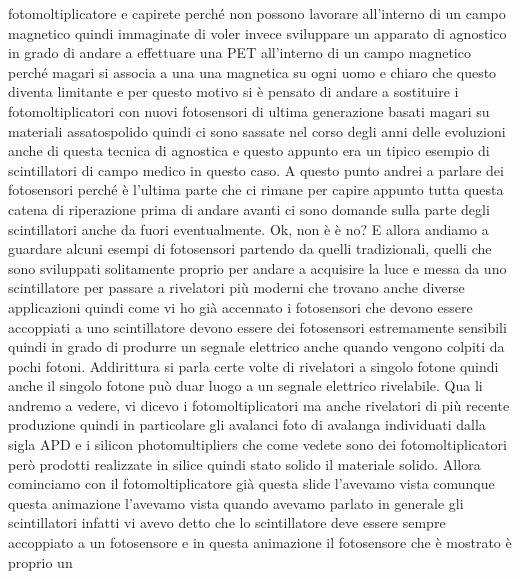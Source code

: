 {fotomoltiplicatore e capirete perché non possono lavorare all'interno di un campo magnetico quindi immaginate di voler invece sviluppare un apparato di agnostico in grado di andare a effettuare una PET all'interno di un campo magnetico perché magari si associa a una una magnetica su ogni uomo e chiaro che questo diventa limitante e per questo motivo si è pensato di andare a sostituire i fotomoltiplicatori con nuovi fotosensori di ultima generazione basati magari su materiali assatospolido quindi ci sono sassate nel corso degli anni delle evoluzioni anche di questa tecnica di agnostica e questo appunto era un tipico esempio di scintillatori di campo medico in questo caso. A questo punto andrei a parlare dei fotosensori perché è l'ultima parte che ci rimane per capire appunto tutta questa catena di riperazione prima di andare avanti ci sono domande sulla parte degli scintillatori anche da fuori eventualmente. Ok, non è è no? E allora andiamo a guardare alcuni esempi di fotosensori partendo da quelli tradizionali, quelli che sono sviluppati solitamente proprio per andare a acquisire la luce e messa da uno scintillatore per passare a rivelatori più moderni che trovano anche diverse applicazioni quindi come vi ho già accennato i fotosensori che devono essere accoppiati a uno scintillatore devono essere dei fotosensori estremamente sensibili quindi in grado di produrre un segnale elettrico anche quando vengono colpiti da pochi fotoni. Addirittura si parla certe volte di rivelatori a singolo fotone quindi anche il singolo fotone può duar luogo a un segnale elettrico rivelabile. Qua li andremo a vedere, vi dicevo i fotomoltiplicatori ma anche rivelatori di più recente produzione quindi in particolare gli avalanci foto di avalanga individuati dalla sigla APD e i silicon photomultipliers che come vedete sono dei fotomoltiplicatori però prodotti realizzate in silice quindi stato solido il materiale solido. Allora cominciamo con il fotomoltiplicatore già questa slide l'avevamo vista comunque questa animazione l'avevamo vista quando avevamo parlato in generale gli scintillatori infatti vi avevo detto che lo scintillatore deve essere sempre accoppiato a un fotosensore e in questa animazione il fotosensore che è mostrato è proprio un 

}
